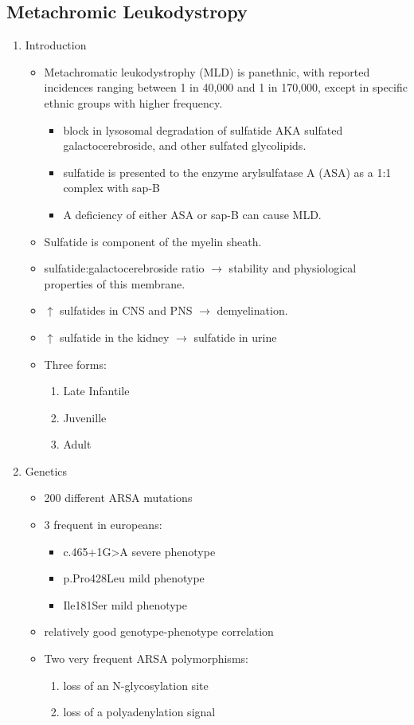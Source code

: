 \documentclass{scrartcl}
\begin{document}
\subsection{Metachromic Leukodystropy}
\label{sec:org84ca5fa}
\begin{enumerate}
\item Introduction
\label{sec:orgdbe758e}

\begin{itemize}
\item Metachromatic leukodystrophy (MLD) is panethnic, with reported
incidences ranging between 1 in 40,000 and 1 in 170,000, except in
specific ethnic groups with higher frequency.
\begin{itemize}
\item block in lysosomal degradation of sulfatide AKA sulfated galactocerebroside, and other sulfated glycolipids.
\item sulfatide is presented to the enzyme arylsulfatase A (ASA) as a
1:1 complex with sap-B
\item A deficiency of either ASA or sap-B can cause MLD.
\end{itemize}
\item Sulfatide is component of the myelin sheath.
\item sulfatide:galactocerebroside ratio \(\to\) stability and physiological properties of this membrane.
\item \(\uparrow\) sulfatides in CNS and PNS \(\to\) demyelination.
\item \(\uparrow\) sulfatide in the kidney \(\to\) sulfatide in urine

\item Three forms:
\begin{enumerate}
\item Late Infantile
\item Juvenille
\item Adult
\end{enumerate}
\end{itemize}


\item Genetics
\label{sec:orgf6b1089}
\begin{itemize}
\item 200 different ARSA mutations
\item 3 frequent in europeans:
\begin{itemize}
\item c.465+1G>A severe phenotype
\item p.Pro428Leu mild phenotype
\item Ile181Ser mild phenotype
\end{itemize}
\item relatively good genotype-phenotype correlation
\item Two very frequent ARSA polymorphisms:
\begin{enumerate}
\item loss of an N-glycosylation site
\item loss of a polyadenylation signal
\end{enumerate}


\end{itemize}
\end{enumerate}
\end{document}
